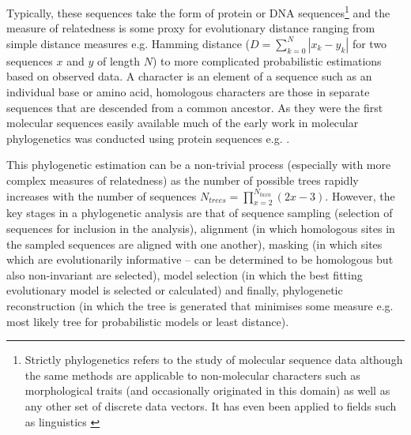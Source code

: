 Typically, these sequences take the form of protein or DNA sequences\footnote{
Strictly phylogenetics refers to the study of molecular sequence data although the same methods are applicable to
non-molecular characters such as morphological traits (and occasionally originated in this domain) as well as any
other set of discrete data vectors. It has even been applied to fields such as linguistics \citep{}
} and the measure of relatedness is some proxy for evolutionary distance ranging from simple distance measures 
e.g. Hamming distance (\(D = \sum_{k=0}^{N}|x_{k} - y_{k}|\) for two sequences \(x\) and \(y\) of length \(N\))
to more complicated probabilistic estimations based on observed data.
A character is an element of a sequence such as an individual base or amino acid, homologous 
characters are those in separate sequences that are descended from a common ancestor.  
As they were the first molecular sequences easily available much of the early work in molecular phylogenetics
was conducted using protein sequences e.g. \citep{Eck1966,Fitch1967}.

This phylogenetic estimation can be a non-trivial process (especially with more complex
measures of relatedness) as the number of
possible trees rapidly increases with the number of sequences \(N_{trees} = \prod_{x=2}^{N_{taxa}} (2x - 3)\).
However, the key stages in a phylogenetic analysis are that of sequence sampling (selection of
sequences for inclusion in the analysis),  alignment (in which homologous sites in the sampled sequences are aligned with one another),
 masking (in which sites which are evolutionarily informative – can be determined to be homologous 
     but also non-invariant are selected), model selection (in which the best fitting
 evolutionary model is selected or calculated) and finally, phylogenetic reconstruction (in which the tree
 is generated that minimises some measure e.g. most likely tree for probabilistic models or 
 least distance).


%
%
%
%
%
%
%
%
%
%
%




